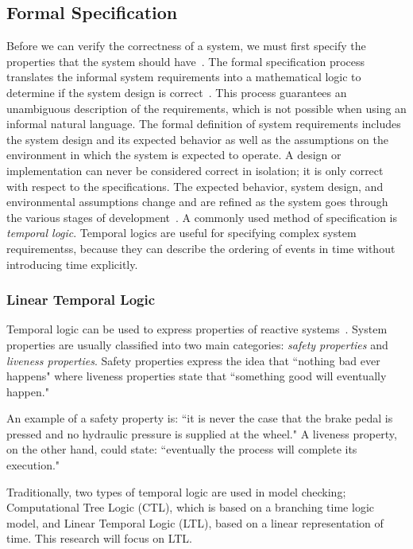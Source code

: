 


\subsection{Formal Specification}
\label{sec:formalSpec}
Before we can verify the correctness of a system, we must first specify the properties that the system should have~\cite{clarke2018model}. The formal specification process translates the informal system requirements into a mathematical logic to determine if the system design is correct~\cite{hinchey2012industrial}. This process guarantees an unambiguous description of the requirements, which is not possible when using an informal natural language. The formal definition of system requirements includes the system design and its expected behavior as well as the assumptions on the environment in which the system is expected to operate. A design or implementation can never be considered correct in isolation; it is only correct with respect to the specifications. The expected behavior, system design, and environmental assumptions change and are refined as the system goes through the various stages of development~\cite{lamsweerde2000formal}. A commonly used method of specification is \emph{temporal logic}. Temporal logics are useful for specifying complex system requirementss, because they can describe the ordering of events in time without introducing time explicitly. 

\subsubsection{Linear Temporal Logic}
Temporal logic can be used to express properties of reactive systems~\cite{Bozzano:2010:DSA:1951720}. System properties are usually classified into two main categories: {\em safety properties} and {\em liveness properties}. Safety properties express the idea that ``nothing bad ever happens" where liveness properties state that ``something good will eventually happen." 

An example of a safety property is: ``it is never the case that the brake pedal is pressed and no hydraulic pressure is supplied at the wheel." A liveness property, on the other hand, could state: ``eventually the process will complete its execution." 

Traditionally, two types of temporal logic are used in model checking; Computational Tree Logic (CTL), which is based on a branching time logic model, and Linear Temporal Logic (LTL), based on a linear representation of time. This research will focus on LTL. 

